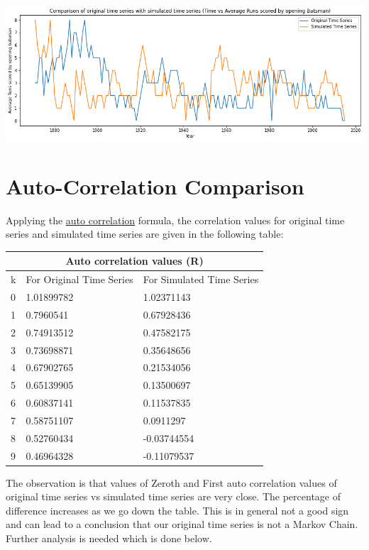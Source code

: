 \documentclass[a4paper, article, oneside, UKenglish]{memoir}
\newcommand{\0}{\mathbf{0}}
\newcommand{\1}{\mathbf{1}}
\begin{document}
\centerline{\includegraphics[scale=0.5]{projectfp-images/OriginalTSVsSimulatedTS.png}}

\section{Auto-Correlation Comparison}
Applying the \hyperref[sec:ac]{auto correlation} formula, the correlation values for original time series and simulated time series are given in the following table:

\setlength{\arrayrulewidth}{1mm}
\setlength{\tabcolsep}{18pt}
\renewcommand{\arraystretch}{2.5}

{
\begin{tabular}{ |p{1cm}|p{3cm}|p{3cm}|  }
\hline
\multicolumn{3}{|c|}{Auto correlation values (R)} \\
\hline
k& For Original Time Series& For Simulated Time Series\\
\hline
0 & 1.01899782 &  1.02371143\\
1 & 0.7960541  &  0.67928436\\
2 & 0.74913512 &  0.47582175\\
3 & 0.73698871 &  0.35648656\\
4 & 0.67902765 &  0.21534056\\
5 & 0.65139905 &  0.13500697\\
6 & 0.60837141 &  0.11537835\\
7 & 0.58751107 &  0.0911297 \\
8 & 0.52760434 & -0.03744554\\
9 & 0.46964328 & -0.11079537\\
\hline
\end{tabular}
}

\vspace{10px}

The observation is that values of Zeroth and First auto correlation values of original time series vs simulated time series are very close. The percentage of difference increases as we go down the table. This is in general not a good sign and can lead to a conclusion that our original time series is not a Markov Chain. Further analysis is needed which is done below.
\end{document}
